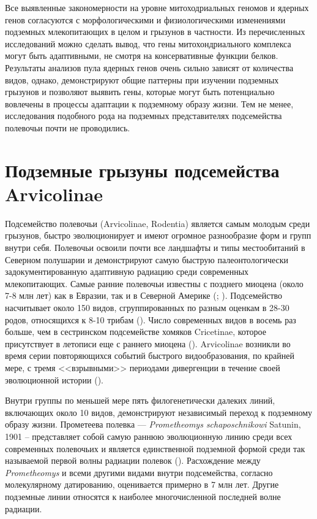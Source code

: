 Все выявленные закономерности на уровне митоходриальных геномов и ядерных генов согласуются с морфологическими и физиологическими изменениями подземных млекопитающих в целом и грызунов в частности. Из перечисленных исследований можно сделать вывод, что гены митохондриального комплекса могут быть адаптивными, не смотря на консервативные функции белков. Результаты анализов пула ядерных генов очень сильно зависят от количества видов, однако, демонстрируют общие паттерны при изучении подземных грызунов и позволяют выявить гены, которые могут быть потенциально вовлечены в процессы адаптации к подземному образу жизни. Тем не менее, исследования подобного рода на подземных представителях подсемейства полевочьи почти не проводились. 



\section{Подземные грызуны подсемейства Arvicolinae}

Подсемейство полевочьи (Arvicolinae, Rodentia) является самым молодым среди грызунов, быстро эволюционирует и имеют огромное разнообразие форм и групп внутри себя. Полевочьи освоили почти все ландшафты и типы местообитаний в Северном полушарии и демонстрируют самую быструю палеонтологически задокументированную адаптивную радиацию среди современных млекопитающих. Самые ранние полевочьи известны с позднего миоцена (около 7-8 млн лет) как в Евразии, так и в Северной Америке (\cite{RobertA.Martin2003}; \cite{Fejfar2011}). Подсемейство насчитывает около 150 видов, сгруппированных по разным оценкам в 28-30 родов, относящихся к 8-10 трибам (\cite{Musser2005}). Число современных видов в восемь раз больше, чем в сестринском подсемействе хомяков Cricetinae, которое присутствует в летописи еще с раннего миоцена (\cite{GomesRodrigues2012}). Arvicolinae возникли во время серии повторяющихся событий быстрого видообразования, по крайней мере, с тремя <<взрывными>> периодами дивергенции в течение своей эволюционной истории (\cite{Abramson2009}).

Внутри группы по меньшей мере пять филогенетически далеких линий, включающих около 10 видов, демонстрируют независимый переход к подземному образу жизни. Прометеева полевка --- \textit{Prometheomys schaposchnikowi} Satunin, 1901 -- представляет собой самую раннюю эволюционную линию среди всех современных полевочьих и является единственной подземной формой среди так называемой первой волны радиации полевок (\cite{Abramson2009}). 
Расхождение между \textit{Prometheomys} и всеми другими видами внутри подсемейства, согласно молекулярному датированию, оценивается примерно в 7 млн лет. Другие подземные линии  относятся к наиболее многочисленной последней волне радиации. 

